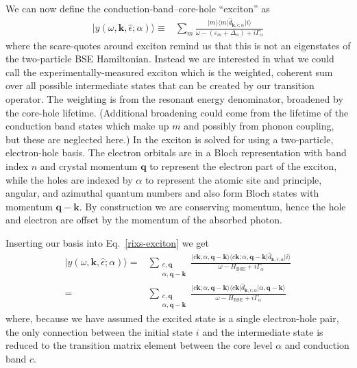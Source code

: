 \documentclass[11pt]{report}
\begin{document}
We can now define the conduction-band--core-hole ``exciton'' as
\begin{align}
\label{rixs-exciton}
\vert y(\omega,\mathbf{k}, \hat{\epsilon};\alpha) \rangle \equiv& \sum_m \frac{ \vert m \rangle \langle m \vert \hat{d}_{\mathbf{k}, \hat{\epsilon};\alpha} \vert i \rangle}{\omega - (\varepsilon_m +\Delta_\alpha) + i\Gamma_{\alpha}} 
\end{align}
where the scare-quotes around exciton remind us that this is not an eigenstates of the two-particle BSE Hamiltonian.
Instead we are interested in what we could call the experimentally-measured exciton which is the weighted, coherent sum over all possible intermediate states that can be created by our transition operator. 
The weighting is from the resonant energy denominator, broadened by the core-hole lifetime. 
(Additional broadening could come from the lifetime of the conduction band states which make up $m$ and possibly from phonon coupling, but these are neglected here.)
In  the exciton is solved for using a two-particle, electron-hole basis. The electron orbitals are in a Bloch representation with band index $n$ and crystal momentum $\mathbf{q}$ to represent the electron part of the exciton, while the holes are indexed by $\alpha$ to represent the atomic site and principle, angular, and azimuthal quantum numbers and also form Bloch states with momentum $\mathbf{q-k}$.
By construction we are conserving momentum, hence the hole and electron are offset by the momentum of the absorbed photon.

Inserting our basis into Eq.~\ref{rixs-exciton} we get
\begin{align}
\vert y(\omega,\mathbf{k}, \hat{\epsilon};\alpha) \rangle =& 
\sum_{\substack{c, \mathbf{q}\\ \alpha, \mathbf{q-k}}} \frac{ \vert c \mathbf{k}; \alpha, \mathbf{q-k}\rangle \langle  c \mathbf{k}; \alpha, \mathbf{q-k} \vert \hat{d}_{\mathbf{k}, \hat{\epsilon};\alpha} \vert i \rangle}{\omega - H_\textrm{BSE} + i\Gamma_{\alpha}} \nonumber \\
=&\sum_{\substack{c, \mathbf{q}\\ \alpha, \mathbf{q-k}}} \frac{ \vert c \mathbf{k}; \alpha, \mathbf{q-k}\rangle \langle  c \mathbf{k} \vert \hat{d}_{\mathbf{k}, \hat{\epsilon};\alpha} \vert  \alpha, \mathbf{q-k} \rangle}{\omega - H_\textrm{BSE} + i\Gamma_{\alpha}} 
\end{align}
where, because we have assumed the excited state is a single electron-hole pair, the only connection between the initial state $i$ and the intermediate state is reduced to the transition matrix element between the core level $\alpha$ and conduction band $c$.
\end{document}
